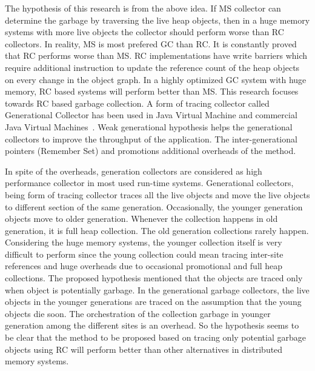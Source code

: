 The hypothesis of this research is from the above idea. If MS collector can determine the garbage by traversing the live heap objects, then in a huge memory systems with more live objects the collector should perform worse than RC collectors. In reality, MS is most prefered GC than RC. It is constantly proved that RC performs worse than MS. RC implementations have write barriers which require additional instruction to update the reference count of the heap objects on every change in the object graph.
In a highly optimized GC system with huge memory, RC based systems will perform better than MS. This research focuses towards RC based garbage collection. A form of tracing collector called Generational Collector has been used in Java Virtual Machine and commercial Java Virtual Machines~\cite{Vengerov,Tene}. Weak generational hypothesis helps the generational collectors to improve the throughput of the application. The inter-generational pointers (Remember Set) and promotions additional overheads of the method. 

In spite of the overheads, generation collectors are considered as high performance collector in most used run-time systems. Generational collectors, being form of tracing collector traces all the live objects and move the live objects to different section of the same generation. Occasionally, the younger generation objects move to older generation. Whenever the collection happens  in old generation, it is full heap collection. The old generation collections rarely happen. Considering the huge memory systems, the younger collection itself is very difficult to perform since the young collection could mean tracing inter-site references and huge overheads due to occasional promotional and full heap collections. The proposed hypothesis mentioned that the objects are traced only when object is potentially garbage.  In the generational garbage collectors, the live objects in the younger generations are traced on the assumption that the young objects die soon. The orchestration of the collection garbage in younger generation among the different sites is an overhead. So the hypothesis seems to be clear that the method to be proposed based on tracing only potential garbage objects using RC will perform better than other alternatives in distributed memory systems.
